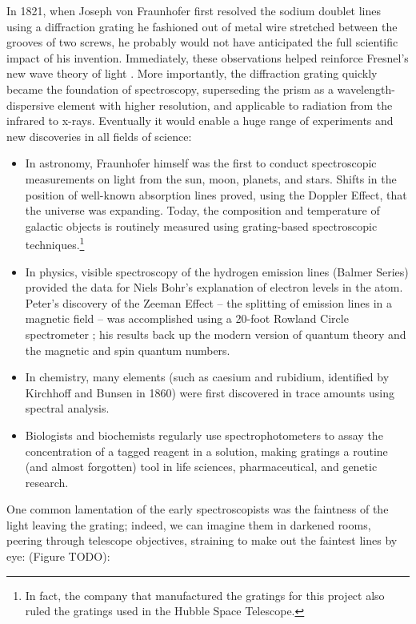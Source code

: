 In 1821, when Joseph von Fraunhofer first resolved the sodium doublet lines using a diffraction grating he fashioned out of metal wire stretched between the grooves of two screws, he probably would not have anticipated the full scientific impact of his invention.
Immediately, these observations helped reinforce Fresnel's new wave theory of light \cite{Fra23}. %
More importantly, the diffraction grating quickly became the foundation of spectroscopy, superseding the prism as a wavelength-dispersive element with higher resolution, and applicable to radiation from the infrared to x-rays.  Eventually it would enable a huge range of experiments and new discoveries in all fields of science:
\begin{itemize}
\item In astronomy, Fraunhofer himself was the first to conduct spectroscopic measurements on light from the sun, moon, planets, and stars.  Shifts in the position of well-known absorption lines proved, using the Doppler Effect, that the universe was expanding.  Today, the composition and temperature of galactic objects is routinely measured using grating-based spectroscopic techniques.\footnote{In fact, the company that manufactured the gratings for this project also ruled the gratings used in the Hubble Space Telescope.}
\item In physics, visible spectroscopy of the hydrogen emission lines (Balmer Series) provided the data for Niels Bohr's explanation of electron levels in the atom.  Peter's discovery of the Zeeman Effect -- the splitting of emission lines in a magnetic field -- was accomplished using a 20-foot Rowland Circle spectrometer \cite{Zee97}; his results back up the modern version of quantum theory and the magnetic and spin quantum numbers.
\item In chemistry, many elements (such as caesium and rubidium, identified by Kirchhoff and Bunsen in 1860) were first discovered in trace amounts using spectral analysis.
\item Biologists and biochemists regularly use spectrophotometers to assay the concentration of a tagged reagent in a solution, making gratings a routine (and almost forgotten) tool in life sciences, pharmaceutical, and genetic research.
\end{itemize}

One common lamentation of the early spectroscopists was the faintness of the light leaving the grating; indeed, we can imagine them in darkened rooms, peering through telescope objectives,  straining to make out the faintest lines by eye: (Figure TODO):

